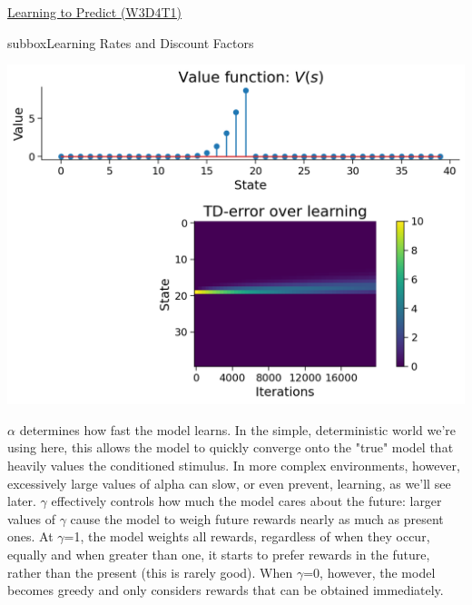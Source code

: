\begin{textbox}{\href{https://compneuro.neuromatch.io/tutorials/W3D4_ReinforcementLearning/student/W3D4_Tutorial1.html}{Learning to Predict (W3D4T1)} }
\begin{subbox}{subbox}{Learning Rates and Discount Factors}
\begin{center}
\includegraphics[scale=0.3]{Figures/RL/RL_Figure3.png}
\end{center}
$\alpha$ determines how fast the model learns. In the simple, deterministic world
we're using here, this allows the model to quickly converge onto the "true"
model that heavily values the conditioned stimulus. In more complex environments,
however, excessively large values of alpha can slow, or even prevent, learning,
as we'll see later.
$\gamma$ effectively controls how much the model cares about the future: larger values of
$\gamma$ cause the model to weigh future rewards nearly as much as present ones. At $\gamma$=1,
the model weights all rewards, regardless of when they occur, equally and when greater than one, it
starts to prefer rewards in the future, rather than the present (this is rarely good).
When $\gamma$=0, however, the model becomes greedy and only considers rewards that
can be obtained immediately.

\end{subbox}



\end{textbox}
